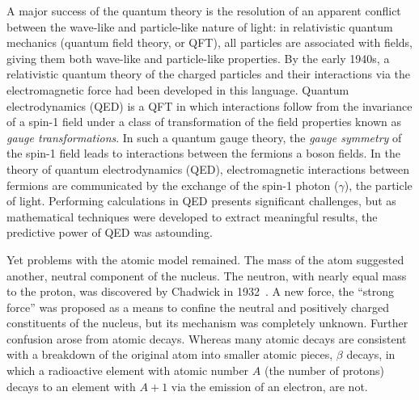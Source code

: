 A major success of the quantum theory is the resolution of an apparent
conflict between the wave-like and particle-like nature of light:
in relativistic quantum mechanics (quantum field theory, or QFT), all particles are associated with fields, giving
them both wave-like and particle-like properties. 
By the early 1940s, a relativistic quantum theory of the charged particles
and their interactions via the electromagnetic force had been developed in 
this language. 
Quantum electrodynamics (QED) is a QFT in which interactions 
follow from the invariance of a spin-1 field under a class of transformation of the field properties
known as \emph{gauge transformations}.
In such a quantum gauge theory, the \emph{gauge symmetry} of the spin-1 field leads to interactions between the fermions
a boson fields.
In the theory of quantum electrodynamics (QED),
electromagnetic interactions 
between fermions are communicated by the 
exchange of the spin-1 photon ($\gamma$),
the particle of light. 
Performing calculations in QED presents significant challenges,
but as mathematical techniques were developed to extract meaningful results,
the predictive power of QED was astounding.

Yet problems with the atomic model remained. The mass of the atom
suggested another, neutral component of the nucleus. 
The neutron, with nearly equal mass to the proton, was
discovered by Chadwick in 1932~\cite{Chadwick:1932ma,doi:10.1098/rspa.1933.0152}. A new force, the ``strong force'' was proposed as
a means to 
confine the neutral and positively charged constituents of the nucleus,
but its mechanism was completely unknown.
Further confusion arose from atomic decays. Whereas many atomic
decays are consistent with a breakdown of the original atom into 
smaller atomic pieces, $\beta$ decays,
in which a radioactive element with atomic number $A$ 
(the number of protons) decays to an element with $A+1$
via the emission of an electron, are not. 

